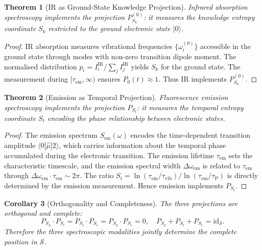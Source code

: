 \documentclass[11pt,a4paper]{article}
\newtheorem{theorem}{Theorem}[section]
\newtheorem{corollary}[theorem]{Corollary}
\theoremstyle{definition}
\theoremstyle{remark}
\newcommand{\Sk}{S_k}
\newcommand{\St}{S_t}
\newcommand{\Se}{S_e}
\newcommand{\Sspace}{\mathcal{S}}
\begin{document}
\begin{theorem}[IR as Ground-State Knowledge Projection]
\label{thm:ir_proj}
Infrared absorption spectroscopy implements the projection $P_{\Sk}^{(0)}$: it measures the knowledge entropy coordinate $\Sk$ restricted to the ground electronic state $|0\rangle$.
\end{theorem}

\begin{proof}
IR absorption measures vibrational frequencies $\{\omega_i^{(0)}\}$ accessible in the ground state through modes with non-zero transition dipole moment. The normalised distribution $p_i = I_i^{\mathrm{IR}} / \sum_j I_j^{\mathrm{IR}}$ yields $\Sk$ for the ground state. The measurement during $[\tau_{\mathrm{em}}, \infty)$ ensures $P_0(t) \approx 1$. Thus IR implements $P_{\Sk}^{(0)}$.
\end{proof}

\begin{theorem}[Emission as Temporal Projection]
\label{thm:emission_proj}
Fluorescence emission spectroscopy implements the projection $P_{\St}$: it measures the temporal entropy coordinate $\St$ encoding the phase relationship between electronic states.
\end{theorem}

\begin{proof}
The emission spectrum $S_{\mathrm{em}}(\omega)$ encodes the time-dependent transition amplitude $\langle 0 | \hat{\mu} | 2 \rangle$, which carries information about the temporal phase accumulated during the electronic transition. The emission lifetime $\tau_{\mathrm{em}}$ sets the characteristic timescale, and the emission spectral width $\Delta\omega_{\mathrm{em}}$ is related to $\tau_{\mathrm{em}}$ through $\Delta\omega_{\mathrm{em}} \cdot \tau_{\mathrm{em}} \sim 2\pi$. The ratio $\St = \ln(\tau_{\mathrm{em}}/\tau_{\mathrm{vib}}) / \ln(\tau_{\mathrm{em}}/\tau_{\mathrm{P}})$ is directly determined by the emission measurement. Hence emission implements $P_{\St}$.
\end{proof}

\begin{corollary}[Orthogonality and Completeness]
\label{cor:complete}
The three projections are orthogonal and complete:
\begin{equation}
P_{\Sk} \cdot P_{\St} = P_{\St} \cdot P_{\Se} = P_{\Sk} \cdot P_{\Se} = 0, \quad P_{\Sk} + P_{\St} + P_{\Se} = \mathrm{id}_{\Sspace}.
\end{equation}
Therefore the three spectroscopic modalities jointly determine the complete position in $\Sspace$.
\end{corollary}
\end{document}
